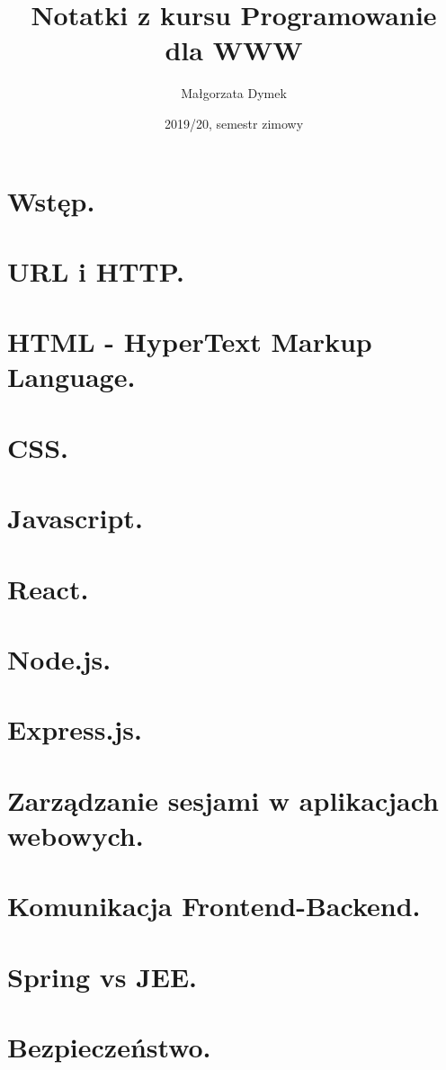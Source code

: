 \documentclass[a4paper]{article}
\title{Notatki z kursu Programowanie dla WWW}
\author{Małgorzata Dymek}
\date{2019/20, semestr zimowy}
\begin{document}
    \maketitle


    \section{Wstęp.}
    


    \section{URL i HTTP.}
    
    


    \section{HTML - HyperText Markup Language.}
    


    \section{CSS.}
    


    \section{Javascript.}
    


    \section{React.}
    


    \section{Node.js.}
    


    \section{Express.js.}
    


    \section{Zarządzanie sesjami w aplikacjach webowych.}
    


    \section{Komunikacja Frontend-Backend.}
    


    \section{Spring vs JEE.}
    


    \section{Bezpieczeństwo.}
    
\end{document}
